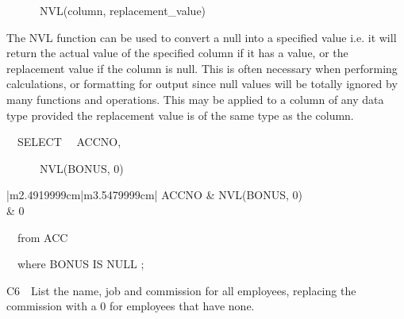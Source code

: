 \ \ \ \ \ \ NVL(column, replacement\_value)

The NVL function can be used to convert a null into a specified value i.e. it will return the actual value of the specified column if it has a value, or the replacement value if the column is null.  This is often necessary when performing calculations, or formatting for output since null values will be totally ignored by many functions and operations.  This may be applied to a column of any data type provided the replacement value is of the same type as the column.

\ \ SELECT \ \ ACCNO,

\ \ \ \ \ \ NVL(BONUS, 0)

\begin{center}
\begin{minipage}{6.442cm}
\begin{flushleft}
\tablefirsthead{}
\tablehead{}
\tabletail{}
\tablelasttail{}
\begin{supertabular}{|m{2.4919999cm}|m{3.5479999cm}|}
\hline
ACCNO &
NVL(BONUS, 0)\\ &
0\\
\end{supertabular}
\end{flushleft}
\end{minipage}
\end{center}
\ \ from ACC

\ \ where BONUS IS NULL ;

C6\ \ List the name, job and commission for all employees, replacing the commission with a 0 for employees that have none.

